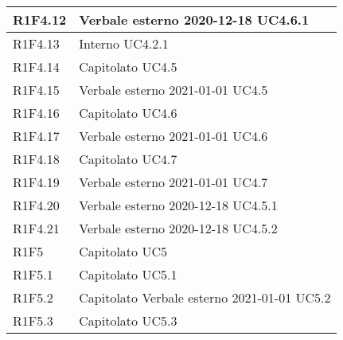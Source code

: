 \begin{center}
\begin{longtable}{|p{22mm}|p{22mm}|}
	\hline
R1F4.12	& 
	Verbale esterno 2020-12-18 \newline	
	UC4.6.1
	\\
	\hline
R1F4.13	& 
	Interno \newline
	UC4.2.1	
	\\

	\hline
R1F4.14	& 
	Capitolato \newline
	UC4.5	
	\\
	\hline
R1F4.15	& 
	Verbale esterno 2021-01-01 \newline
	UC4.5	
	\\

	\hline
R1F4.16	& 
	Capitolato \newline
	UC4.6	
	\\
	\hline
R1F4.17	& 
		Verbale esterno 2021-01-01 \newline
		UC4.6
		\\
	\hline
R1F4.18	& 
	Capitolato \newline	
	UC4.7
	\\
	\hline
R1F4.19	& 
	Verbale esterno 2021-01-01 \newline
	UC4.7	
	\\

	\hline
R1F4.20	& 
	Verbale esterno 2020-12-18 \newline
	UC4.5.1
	\\
	\hline
R1F4.21	& 
	Verbale esterno 2020-12-18 \newline	
	UC4.5.2
	\\
	\hline
R1F5	& 
	Capitolato \newline	
	UC5
	\\
	\hline
R1F5.1	& 
	Capitolato \newline	
	UC5.1
	\\
	\hline
R1F5.2	& 
	Capitolato \newline	
	Verbale esterno 2021-01-01 \newline
	UC5.2
	\\
	\hline
R1F5.3	& 
	Capitolato \newline
	UC5.3	
	\\


\end{longtable}
\end{center}
